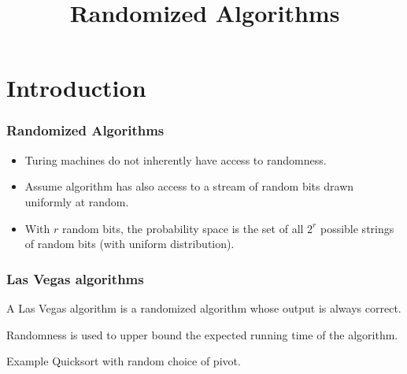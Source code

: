 
%
%

\newcommand{\mcF}{\mathcal{F}}
\newcommand{\bs}{\backslash}
\newcommand{\phisub}{\textsc{$\Phi$-Sub\-set}\xspace}
\newcommand{\phiext}{\textsc{$\Phi$-Ex\-ten\-sion}\xspace}



\title[Randomized Algorithms]
{Randomized Algorithms}

\begin{frame}
   \titlepage
\end{frame}

\lecturenotes{\maketitle}

\begin{frame}
 \tableofcontents
\end{frame}

\section{Introduction} 

\begin{frame}[c]\frametitle{Randomized Algorithms}


    \begin{itemize}
        \item Turing machines do not inherently have access to randomness.
        \item Assume algorithm has also access to a stream of \alert{random bits} drawn uniformly at random.
        \item With $r$ random bits, the probability space is the set of all $2^r$ possible strings of random bits (with uniform distribution).
    \end{itemize}
    

\end{frame}

\begin{frame}\frametitle{Las Vegas algorithms}
    \begin{definition}
		A \alert{Las Vegas algorithm} is a randomized algorithm whose output is always correct.
	\end{definition}

	\noindent
	Randomness is used to upper bound the expected running time of the algorithm.
	
	\begin{block}{Example}
		Quicksort with random choice of pivot.
	\end{block}
\end{frame}

